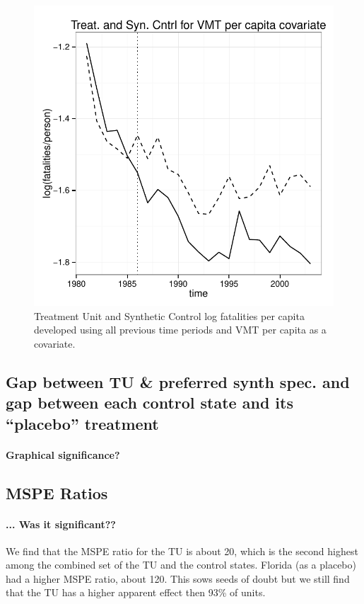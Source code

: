 \documentclass[letterpaper, 12pt]{article}
\begin{document}
\begin{figure}[htbp]
\begin{center}
\includegraphics{img-split-vmt.pdf}
\caption{Treatment Unit and Synthetic Control log fatalities per capita developed using all previous time periods and VMT per capita as a covariate.}
\label{fig:c16}
\end{center}
\end{figure}


\subsection{Gap between TU \& preferred synth spec. and gap between each control state and its ``placebo'' treatment}

\paragraph{Graphical significance?}


\subsection{MSPE Ratios}

\paragraph{... Was it significant??}  We find that the MSPE ratio for the TU is about 20, which is the second highest among the combined set of the TU and the control states.  Florida (as a placebo) had a higher MSPE ratio, about 120.  This sows seeds of doubt but we still find that the TU has a higher apparent effect then 93\% of units.  
\end{document}
